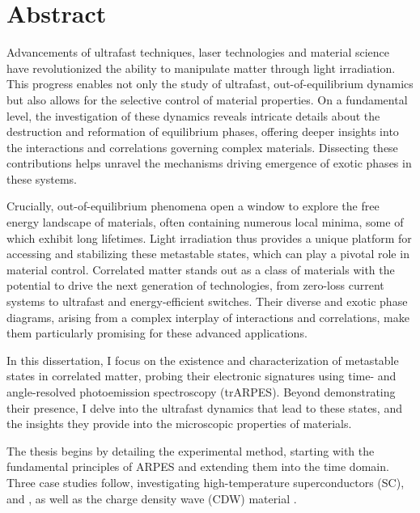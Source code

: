 

\cleardoublepage
\chapter*{Abstract}
Advancements of ultrafast techniques, laser technologies and material science have revolutionized the ability to manipulate matter through light irradiation.
This progress enables not only the study of ultrafast, out-of-equilibrium dynamics but also allows for the selective control of material properties.
On a fundamental level, the investigation of these dynamics reveals intricate details about the destruction and reformation of equilibrium phases, offering deeper insights into the interactions and correlations governing complex materials.
Dissecting these contributions helps unravel the mechanisms driving emergence of exotic phases in these systems.

Crucially, out-of-equilibrium phenomena open a window to explore the free energy landscape of materials, often containing numerous local minima, some of which exhibit long lifetimes.
Light irradiation thus provides a unique platform for accessing and stabilizing these metastable states, which can play a pivotal role in material control.
Correlated matter stands out as a class of materials with the potential to drive the next generation of technologies, from zero-loss current systems to ultrafast and energy-efficient switches.
Their diverse and exotic phase diagrams, arising from a complex interplay of interactions and correlations, make them particularly promising for these advanced applications.\hfill\break

In this dissertation, I focus on the existence and characterization of metastable states in correlated matter, probing their electronic signatures using time- and angle-resolved photoemission spectroscopy (trARPES).
Beyond demonstrating their presence, I delve into the ultrafast dynamics that lead to these states, and the insights they provide into the microscopic properties of materials.\hfill\break

The thesis begins by detailing the experimental method, starting with the fundamental principles of ARPES and extending them into the time domain.
Three case studies follow, investigating high-temperature superconductors (SC),  and , as well as the charge density wave (CDW) material .

